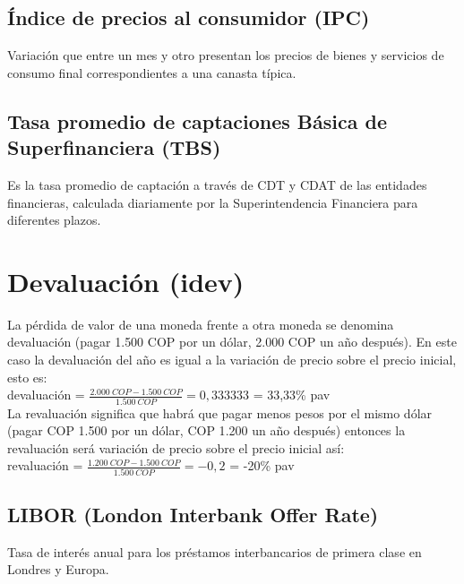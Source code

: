 \subsection{Índice de precios al consumidor (IPC)}
Variación que entre un mes y otro presentan los precios de bienes y servicios de consumo final correspondientes a una canasta típica.

\subsection{Tasa promedio de captaciones Básica de Superfinanciera (TBS)}
Es la tasa promedio de captación a través de CDT y CDAT de las entidades financieras, calculada diariamente por la Superintendencia Financiera para diferentes plazos.

\section{Devaluación (idev)}
La pérdida de valor de una moneda frente a otra moneda se denomina devaluación (pagar  1{.}500 COP por un dólar,  2{.}000 COP un año después). En este caso la devaluación del año es igual a la variación de precio sobre el precio inicial, esto es: \\

devaluación = $\frac{ 2{.}000 \ COP - 1{.}500 \ COP}{ 1{.}500 \ COP} = 0,333333 $ = 33,33\% pav \\

La revaluación significa que habrá que pagar menos pesos por el mismo dólar (pagar  COP 1{.}500 por un dólar,  COP 1{.}200 un año después) entonces la revaluación será variación de precio sobre el precio inicial así: \\

revaluación = $\frac{ 1{.}200 \ COP - 1{.}500 \ COP}{ 1{.}500 \ COP} = -0,2$ = -20\% pav \\

\subsection{LIBOR (London Interbank Offer Rate)}
Tasa de interés anual para los préstamos interbancarios de primera clase en Londres y Europa.
\\
\\



